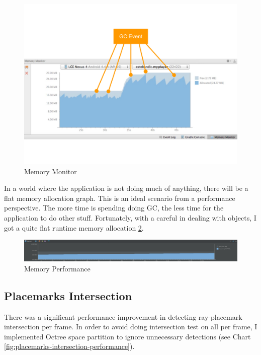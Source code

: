 \begin{figure}[H]
	\caption[Memory Monitor]{Memory Monitor \cite{google.memory-monitor.2015}}
	\label{fig:memory-monitor}
	\centering
	\includegraphics[width=\textwidth, keepaspectratio]{Figures/memory-monitor.png}
	\decoRule
\end{figure}

In a world where the application is not doing much of anything, there will be a flat memory allocation graph. This is an ideal scenario from a performance perspective. The more time is spending doing GC, the less time for the application to do other stuff. Fortunately, with a careful in dealing with objects, I got a quite flat runtime memory allocation \ref{fig:memory-performance}.

\begin{figure}[H]
	\caption{Memory Performance}
	\label{fig:memory-performance}
	\centering
	\includegraphics[width=\textwidth, keepaspectratio]{Figures/memory-performance.png}
	\decoRule
\end{figure}

\subsection{Placemarks Intersection}
\label{section:placemarks-intersection}

There was a significant performance improvement in detecting ray-placemark intersection per frame. In order to avoid doing intersection test on all  per frame, I implemented Octree space partition to ignore unnecessary detections (see Chart \ref{fig:placemarks-intersection-performance}).

